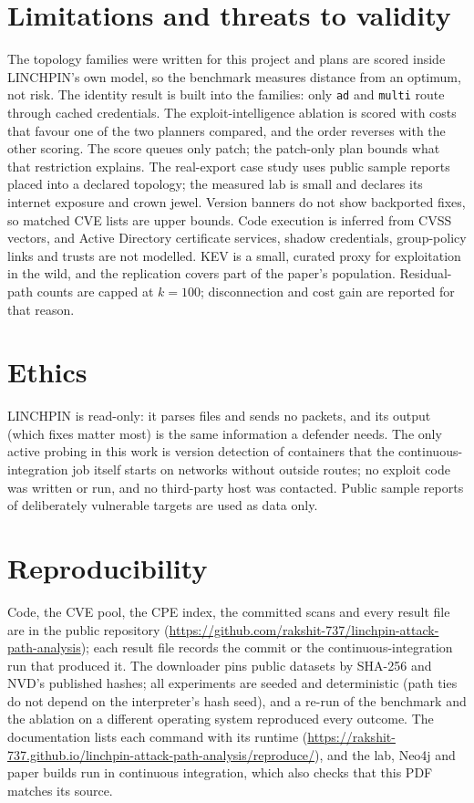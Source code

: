\documentclass[11pt]{article}
\begin{document}
\section{Limitations and threats to validity}

The topology families were written for this project and plans are scored inside LINCHPIN's own model, so the benchmark
measures distance from an optimum, not risk. The identity result is built into the families: only \texttt{ad} and
\texttt{multi} route through cached credentials. The exploit-intelligence ablation is scored with costs that favour
one of the two planners compared, and the order reverses with the other scoring. The score queues only patch; the
patch-only plan bounds what that restriction explains. The real-export case study uses public sample reports placed
into a declared topology; the measured lab is small and declares its internet exposure and crown jewel. Version
banners do not show backported fixes, so matched CVE lists are upper bounds. Code execution is inferred from CVSS
vectors, and Active Directory certificate services, shadow credentials, group-policy links and trusts are not
modelled. KEV is a small, curated proxy for exploitation in the wild, and the replication covers part of the paper's
population. Residual-path counts are capped at $k = 100$; disconnection and cost gain are reported for that reason.

\section{Ethics}

LINCHPIN is read-only: it parses files and sends no packets, and its output (which fixes matter most) is the same
information a defender needs. The only active probing in this work is version detection of containers that the
continuous-integration job itself starts on networks without outside routes; no exploit code was written or run, and
no third-party host was contacted. Public sample reports of deliberately vulnerable targets are used as data only.

\section{Reproducibility}

Code, the CVE pool, the CPE index, the committed scans and every result file are in the public repository
(\url{https://github.com/rakshit-737/linchpin-attack-path-analysis}); each result file records the commit or the continuous-integration run
that produced it. The downloader pins public datasets by SHA-256 and NVD's published hashes; all experiments are
seeded and deterministic (path ties do not depend on the interpreter's hash seed), and a re-run of the benchmark and
the ablation on a different operating system reproduced every outcome. The documentation lists each command with its
runtime (\url{https://rakshit-737.github.io/linchpin-attack-path-analysis/reproduce/}), and the lab, Neo4j and paper builds run in
continuous integration, which also checks that this PDF matches its source.
\end{document}
